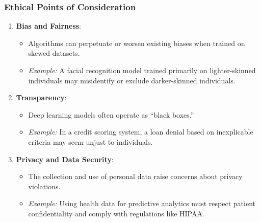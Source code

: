 \documentclass[aspectratio=169]{beamer}
\begin{document}
\begin{frame}[fragile]
    \frametitle{Ethical Points of Consideration}
    \begin{enumerate}
        \item \textbf{Bias and Fairness}:
            \begin{itemize}
                \item Algorithms can perpetuate or worsen existing biases when trained on skewed datasets.
                \item \textit{Example:} A facial recognition model trained primarily on lighter-skinned individuals may misidentify or exclude darker-skinned individuals.
            \end{itemize}
        
        \item \textbf{Transparency}:
            \begin{itemize}
                \item Deep learning models often operate as ``black boxes.'' 
                \item \textit{Example:} In a credit scoring system, a loan denial based on inexplicable criteria may seem unjust to individuals.
            \end{itemize}

        \item \textbf{Privacy and Data Security}:
            \begin{itemize}
                \item The collection and use of personal data raise concerns about privacy violations.
                \item \textit{Example:} Using health data for predictive analytics must respect patient confidentiality and comply with regulations like HIPAA.
            \end{itemize}
    \end{enumerate}
\end{frame}
\end{document}
